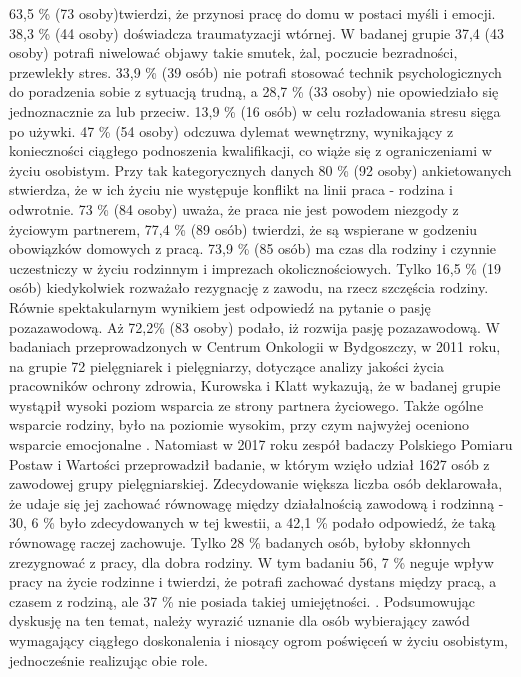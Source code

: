 \documentclass[a4paper,12pt,twoside,openany]{report}
\begin{document}
  63,5 \%  (73 osoby)twierdzi, że przynosi pracę do domu w postaci myśli i emocji. 38,3 \% (44 osoby) doświadcza traumatyzacji wtórnej. W badanej grupie 37,4 (43 osoby) potrafi niwelować objawy takie smutek, żal, poczucie bezradności, przewlekły stres. 33,9 \%  (39 osób) nie potrafi stosować technik psychologicznych do poradzenia sobie z sytuacją trudną, a 28,7 \%  (33 osoby) nie opowiedziało się jednoznacznie za lub przeciw. 13,9 \% (16 osób) w celu rozładowania stresu sięga po używki. 47 \% (54 osoby) odczuwa dylemat wewnętrzny, wynikający z konieczności ciągłego podnoszenia kwalifikacji, co wiąże się z ograniczeniami w życiu osobistym. Przy tak kategorycznych danych 80 \% (92 osoby) ankietowanych stwierdza, że w ich życiu nie występuje konflikt na linii praca - rodzina i odwrotnie. 73 \% (84 osoby) uważa, że praca nie jest powodem niezgody z życiowym partnerem, 77,4 \%  (89 osób) twierdzi, że są wspierane w godzeniu obowiązków domowych z pracą. 73,9 \% (85 osób) ma czas dla rodziny i czynnie uczestniczy w życiu rodzinnym i imprezach okolicznościowych. Tylko 16,5 \% (19 osób) kiedykolwiek rozważało rezygnację z zawodu, na rzecz szczęścia rodziny. Równie spektakularnym wynikiem jest odpowiedź na pytanie o pasję pozazawodową. Aż 72,2\% (83 osoby) podało, iż rozwija pasję pozazawodową.  W badaniach  przeprowadzonych w Centrum Onkologii w Bydgoszczy, w 2011 roku, na grupie 72 pielęgniarek i pielęgniarzy, dotyczące analizy jakości życia pracowników ochrony zdrowia, Kurowska i Klatt  wykazują, że w badanej grupie wystąpił wysoki poziom wsparcia ze strony partnera życiowego. Także ogólne wsparcie rodziny, było na poziomie wysokim, przy czym najwyżej oceniono wsparcie emocjonalne \cite{ poziom}. Natomiast w 2017 roku zespół badaczy Polskiego Pomiaru Postaw i Wartości przeprowadził badanie, w którym wzięło udział 1627 osób z zawodowej grupy pielęgniarskiej. Zdecydowanie większa liczba osób deklarowała, że udaje się jej zachować równowagę między działalnością zawodową i rodzinną - 30, 6 \% było zdecydowanych w tej kwestii, a 42,1 \% podało odpowiedź, że taką równowagę raczej zachowuje. Tylko 28 \% badanych osób, byłoby skłonnych zrezygnować z pracy, dla dobra rodziny. W tym badaniu  56, 7 \% neguje wpływ pracy na życie rodzinne i twierdzi, że potrafi zachować dystans między pracą, a czasem z rodziną, ale 37 \% nie posiada takiej umiejętności. \cite{komunikat}.
Podsumowując dyskusję na ten temat, należy wyrazić uznanie dla osób wybierający  zawód  wymagający ciągłego doskonalenia i niosący ogrom poświęceń w życiu osobistym, jednocześnie realizując obie role.
\end{document}
